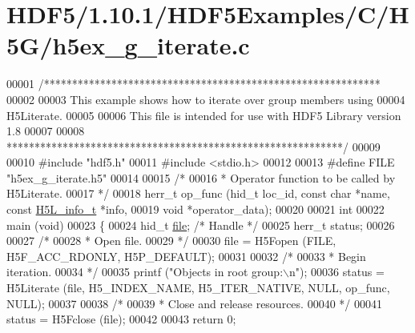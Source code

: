 \hypertarget{_h_d_f5_21_810_81_2_h_d_f5_examples_2_c_2_h5_g_2h5ex__g__iterate_8c_source}{}\section{H\+D\+F5/1.10.1/\+H\+D\+F5\+Examples/\+C/\+H5\+G/h5ex\+\_\+g\+\_\+iterate.c}
\label{_h_d_f5_21_810_81_2_h_d_f5_examples_2_c_2_h5_g_2h5ex__g__iterate_8c_source}

\begin{DoxyCode}
00001 \textcolor{comment}{/************************************************************}
00002 \textcolor{comment}{}
00003 \textcolor{comment}{  This example shows how to iterate over group members using}
00004 \textcolor{comment}{  H5Literate.}
00005 \textcolor{comment}{}
00006 \textcolor{comment}{  This file is intended for use with HDF5 Library version 1.8}
00007 \textcolor{comment}{}
00008 \textcolor{comment}{ ************************************************************/}
00009 
00010 \textcolor{preprocessor}{#include "hdf5.h"}
00011 \textcolor{preprocessor}{#include <stdio.h>}
00012 
00013 \textcolor{preprocessor}{#define FILE       "h5ex\_g\_iterate.h5"}
00014 
00015 \textcolor{comment}{/*}
00016 \textcolor{comment}{ * Operator function to be called by H5Literate.}
00017 \textcolor{comment}{ */}
00018 herr\_t op\_func (hid\_t loc\_id, \textcolor{keyword}{const} \textcolor{keywordtype}{char} *name, \textcolor{keyword}{const} \hyperlink{struct_h5_l__info__t}{H5L\_info\_t} *info,
00019             \textcolor{keywordtype}{void} *operator\_data);
00020 
00021 \textcolor{keywordtype}{int}
00022 main (\textcolor{keywordtype}{void})
00023 \{
00024     hid\_t           \hyperlink{structfile}{file};           \textcolor{comment}{/* Handle */}
00025     herr\_t          status;
00026 
00027     \textcolor{comment}{/*}
00028 \textcolor{comment}{     * Open file.}
00029 \textcolor{comment}{     */}
00030     file = H5Fopen (FILE, H5F\_ACC\_RDONLY, H5P\_DEFAULT);
00031 
00032     \textcolor{comment}{/*}
00033 \textcolor{comment}{     * Begin iteration.}
00034 \textcolor{comment}{     */}
00035     printf (\textcolor{stringliteral}{"Objects in root group:\(\backslash\)n"});
00036     status = H5Literate (file, H5\_INDEX\_NAME, H5\_ITER\_NATIVE, NULL, op\_func, NULL);
00037 
00038     \textcolor{comment}{/*}
00039 \textcolor{comment}{     * Close and release resources.}
00040 \textcolor{comment}{     */}
00041     status = H5Fclose (file);
00042 
00043     \textcolor{keywordflow}{return} 0;

\end{DoxyCode}
